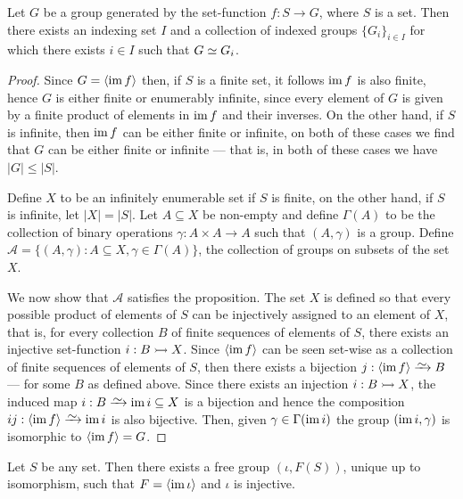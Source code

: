 \begin{lemma}\label{lem:isomorphism-indexing-set-group}
Let \(G\) be a group generated by the set-function \(f: S \to G\), where
\(S\) is a set. Then there exists an indexing set \(I\) and a collection of
indexed groups \(\{G_i\}_{i \in I}\) for which there exists \(i \in I\) such
that \(G \simeq G_i\).
\end{lemma}

\begin{proof} Since \(G = \left\langle \operatorname{im} f \right\rangle\) then, if \(S\) is a
finite set, it follows \(\operatorname{im} f\) is also finite, hence \(G\) is either finite or
enumerably infinite, since every element of \(G\) is given by a finite product
of elements in \(\operatorname{im} f\) and their inverses. On the other hand, if \(S\) is
infinite, then \(\operatorname{im} f\) can be either finite or infinite, on both of these
cases we find that \(G\) can be either finite or infinite --- that is, in both
of these cases we have \(|G| \leq |S|\).

Define \(X\) to be an infinitely enumerable set if \(S\) is finite, on the other
hand, if \(S\) is infinite, let \(|X| = |S|\). Let \(A \subseteq X\) be
non-empty and define \(\Gamma(A)\) to be the collection of binary operations
\(\gamma: A \times A \to A\) such that \((A, \gamma)\) is a group. Define
\(\mathcal{A} = \{(A, \gamma): A \subseteq X, \gamma \in \Gamma(A)\}\), the
collection of groups on subsets of the set \(X\).

We now show that \(\mathcal{A}\) satisfies the proposition. The set \(X\) is
defined so that every possible product of elements of \(S\) can be injectively
assigned to an element of \(X\), that is, for every collection \(B\) of finite
sequences of elements of \(S\), there exists an injective set-function \(i: B
\rightarrowtail X\). Since \(\left\langle \operatorname{im} f \right\rangle\) can be seen set-wise as a
collection of finite sequences of elements of \(S\), then there exists a
bijection \(j: \left\langle \im f \right\rangle \isoto B\) --- for some \(B\) as
defined above. Since there exists an injection \(i: B \rightarrowtail X\), the induced map
\(i: B \isoto \im i \subseteq X\) is a bijection and hence the composition \(ij:
\left\langle \im f \right\rangle \isoto \im i\) is also bijective. Then, given
\(\gamma \in \Gamma(\operatorname{im} i)\) the group \((\operatorname{im} i, \gamma)\) is isomorphic to
\(\left\langle \operatorname{im} f \right\rangle = G\).
\end{proof}

\begin{proposition}
\label{prop:universal-free-group}
Let \(S\) be any set. Then there exists a free group \((\iota, F(S))\), unique
up to isomorphism, such that \(F = \left\langle \operatorname{im} \iota \right\rangle\) and
\(\iota\) is injective.
\end{proposition}


